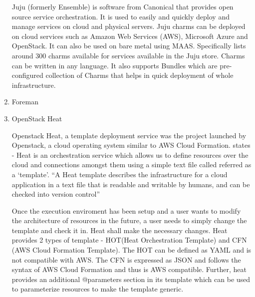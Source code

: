 \begin{enumerate}
Juju (formerly Ensemble) \label{\detokenize{i524/technologies:id589}}{\hyperref[\detokenize{i524/technologies:juju-paper}]{\sphinxcrossref{{[}507{]}}}} is software from
Canonical that provides open source service orchestration. It is
used to easily and quickly deploy and manage services on cloud
and physical servers. Juju charms can be deployed on cloud
services such as Amazon Web Services (AWS), Microsoft Azure and
OpenStack. It can also be used on bare metal using MAAS.
Specifically \label{\detokenize{i524/technologies:id590}}{\hyperref[\detokenize{i524/technologies:www-juju}]{\sphinxcrossref{{[}508{]}}}} lists around 300 charms available
for services available in the Juju store. Charms can be written
in any language. It also supports Bundles which are
pre-configured collection of Charms that helps in quick
deployment of whole infrastructure.

\item {} 
Foreman

\item {} 
OpenStack Heat

Openstack Heat, a template deployment service was the project
launched by Openstack, a cloud operating system similar to AWS
Cloud Formation. \label{\detokenize{i524/technologies:id591}}{\hyperref[\detokenize{i524/technologies:www-heat-blog-introduction}]{\sphinxcrossref{{[}509{]}}}} states - Heat
is an orchestration service which allows us to define resources
over the cloud and connections amongst them using a simple text
file called referred as a ‘template’. ``A Heat template describes
the infrastructure for a cloud application in a text file that is
readable and writable by humans, and can be checked into version
control'' \label{\detokenize{i524/technologies:id592}}{\hyperref[\detokenize{i524/technologies:www-heat-wiki}]{\sphinxcrossref{{[}510{]}}}}

Once the execution enviroment has been setup and a user wants to
modify the architecture of resources in the future, a user needs
to simply change the template and check it in. Heat shall make
the necessary changes. Heat provides 2 types of template -
HOT(Heat Orchestration Template) and CFN (AWS Cloud Formation
Template). The HOT can be defined as YAML and is not compatible
with AWS. The CFN is expressed as JSON and follows the syntax of
AWS Cloud Formation and thus is AWS compatible. Further, heat
provides an additional @parameters section in its template which
can be used to parameterize resources to make the template
generic.


\end{enumerate}
